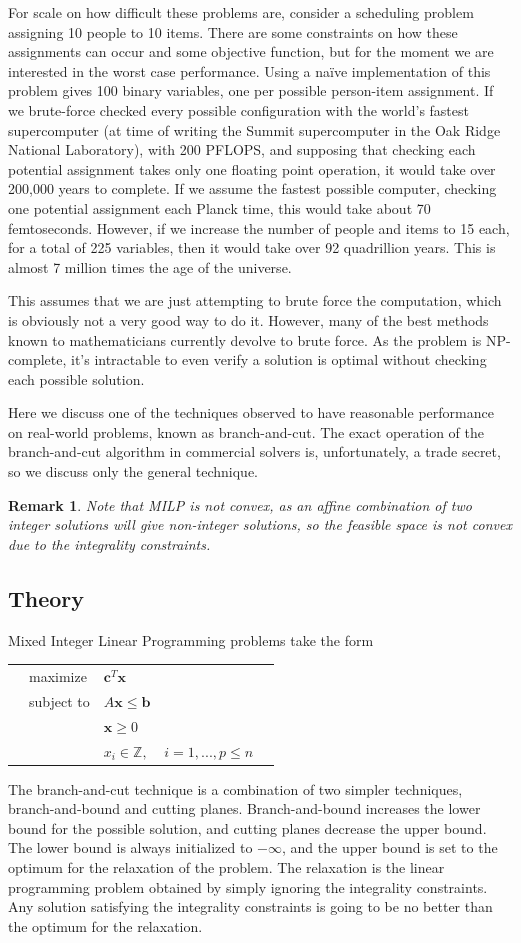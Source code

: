 \documentclass[10pt]{article}
\renewcommand{\vec}[1]{\mathbf{#1}}
\newcommand{\x}{\vec{x}}
\renewcommand{\b}{\vec{b}}
\renewcommand{\c}{\vec{c}}
\newtheorem*{remark}{Remark}
\begin{document}
For scale on how difficult these problems are, consider a scheduling problem assigning 10 people to 10 items. There are some constraints on how these assignments can occur and some objective function, but for the moment we are interested in the worst case performance. Using a na\"{i}ve implementation of this problem gives 100 binary variables, one per possible person-item assignment. If we brute-force checked every possible configuration with the world's fastest supercomputer (at time of writing the Summit supercomputer in the Oak Ridge National Laboratory), with 200 PFLOPS, and supposing that checking each potential assignment takes only one floating point operation, it would take over 200,000 years to complete. If we assume the fastest possible computer, checking one potential assignment each Planck time, this would take about 70 femtoseconds. However, if we increase the number of people and items to 15 each, for a total of 225 variables, then it would take over 92 quadrillion years. This is almost 7 million times the age of the universe.

This assumes that we are just attempting to brute force the computation, which is obviously not a very good way to do it. However, many of the best methods known to mathematicians currently devolve to brute force. As the problem is NP-complete, it's intractable to even verify a solution is optimal without checking each possible solution.

Here we discuss one of the techniques observed to have reasonable performance on real-world problems, known as branch-and-cut\cite{mitchell-bandc}. The exact operation of the branch-and-cut algorithm in commercial solvers is, unfortunately, a trade secret, so we discuss only the general technique.
\begin{remark}
	Note that MILP is not convex, as an affine combination of two integer solutions will give non-integer solutions, so the feasible space is not convex due to the integrality constraints.
\end{remark}
\subsection{Theory}
Mixed Integer Linear Programming problems take the form\\
\begin{tabularx}{0.9\textwidth}{X l l l X}
	& maximize		& $\c^T\x$ & & \\
	& subject to	& $A\x \leq \b{}$ & &\\
	& 				& $\x\geq 0$ & & \\
	&				& $x_i\in\mathbb{Z},$ & $i=1,...,p\leq n$
\end{tabularx}
The branch-and-cut technique is a combination of two simpler techniques, branch-and-bound and cutting planes\cite{mitchell-bandc}. Branch-and-bound increases the lower bound for the possible solution, and cutting planes decrease the upper bound. The lower bound is always initialized to $-\infty$, and the upper bound is set to the optimum for the relaxation of the problem. The relaxation is the linear programming problem obtained by simply ignoring the integrality constraints. Any solution satisfying the integrality constraints is going to be no better than the optimum for the relaxation.
\end{document}

